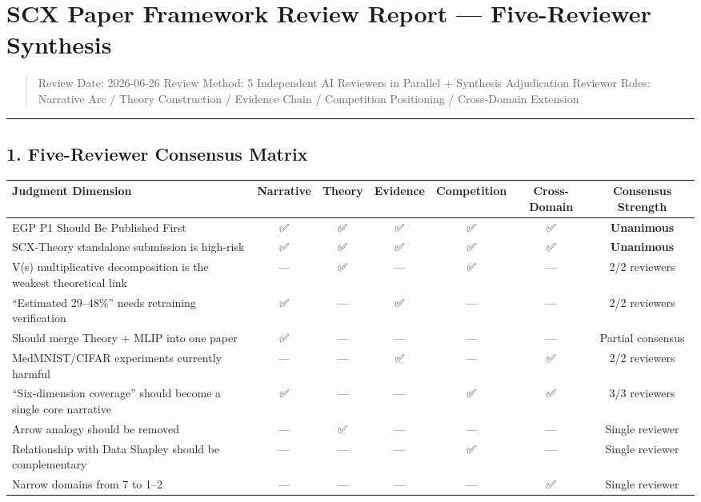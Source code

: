 \documentclass[
  12pt,
]{article}
\author{SCX}
\date{2026}
\begin{document}
\section{SCX Paper Framework Review Report ---
Five-Reviewer Synthesis}\label{scx-paper-framework-review-report-five-reviewer-synthesis}

\begin{quote}
Review Date: 2026-06-26 \quad Review Method: 5 Independent AI Reviewers in Parallel + Synthesis Adjudication
Reviewer Roles: Narrative Arc / Theory Construction / Evidence Chain / Competition Positioning / Cross-Domain Extension
\end{quote}

\begin{center}\rule{0.5\linewidth}{0.5pt}\end{center}

\subsection{1. Five-Reviewer Consensus Matrix}\label{five-reviewer-consensus-matrix}

\begin{longtable}[]{@{}lcccccc@{}}
\toprule\noalign{}
Judgment Dimension & Narrative & Theory & Evidence & Competition & Cross-Domain & Consensus Strength \\
\midrule\noalign{}
\endhead
\bottomrule\noalign{}
\endlastfoot
EGP P1 Should Be Published First & ✅ & ✅ & ✅ & ✅ & ✅ & \textbf{Unanimous} \\
SCX-Theory standalone submission is high-risk & ✅ & ✅ & ✅ & ✅ & ✅ & \textbf{Unanimous} \\
V(s) multiplicative decomposition is the weakest theoretical link & --- & ✅ & --- & ✅ & --- & 2/2 reviewers \\
``Estimated 29--48\%'' needs retraining verification & ✅ & --- & ✅ & --- & --- & 2/2 reviewers \\
Should merge Theory + MLIP into one paper & ✅ & --- & --- & --- & --- & Partial consensus \\
MedMNIST/CIFAR experiments currently harmful & --- & --- & ✅ & --- & ✅ & 2/2 reviewers \\
``Six-dimension coverage'' should become a single core narrative & ✅ & --- & --- & ✅ & ✅ & 3/3 reviewers \\
Arrow analogy should be removed & --- & ✅ & --- & --- & --- & Single reviewer \\
Relationship with Data Shapley should be complementary & --- & --- & --- & ✅ & --- & Single reviewer \\
Narrow domains from 7 to 1--2 & --- & --- & --- & --- & ✅ & Single reviewer \\
\end{longtable}
\end{document}
